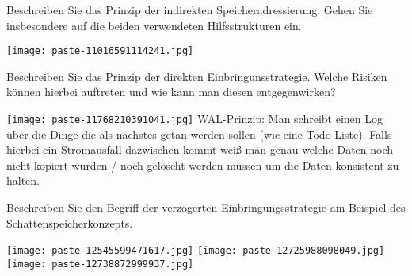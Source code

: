 \documentclass{article}
\begin{document}
\begin{tcolorbox}[colback=white!10!white,colframe=lightgray!75!black,
  savelowerto=\jobname_ex.tex]

\begin{center}
 Beschreiben Sie das Prinzip der 
indirekten
Speicheradressierung. Gehen Sie insbesondere auf die beiden verwendeten Hilfsstrukturen ein. 

\end{center}

\tcblower

\justifying
\texttt{[image: paste-11016591114241.jpg]}

\end{tcolorbox}
\begin{tcolorbox}[colback=white!10!white,colframe=lightgray!75!black,
  savelowerto=\jobname_ex.tex]

\begin{center}
 Beschreiben Sie das Prinzip der 
direkten
Einbringunsstrategie.
Welche Risiken können hierbei auftreten und wie kann man diesen entgegenwirken? 

\end{center}

\tcblower

\justifying
\texttt{[image: paste-11768210391041.jpg]}
WAL-Prinzip: Man schreibt einen Log über die Dinge die als nächstes getan werden sollen (wie eine Todo-Liste). Falls hierbei ein Stromausfall dazwischen kommt weiß man genau welche Daten noch nicht kopiert wurden / noch gelöscht werden müssen um die Daten konsistent zu halten.

\end{tcolorbox}
\begin{tcolorbox}[colback=white!10!white,colframe=lightgray!75!black,
  savelowerto=\jobname_ex.tex]

\begin{center}
 Beschreiben Sie den Begriff der
verzögerten Einbringungsstrategie
am Beispiel des 
Schattenspeicherkonzepts.
 

\end{center}

\tcblower

\justifying
\texttt{[image: paste-12545599471617.jpg]}
\texttt{[image: paste-12725988098049.jpg]}
\texttt{[image: paste-12738872999937.jpg]}

\end{tcolorbox}
\end{document}
